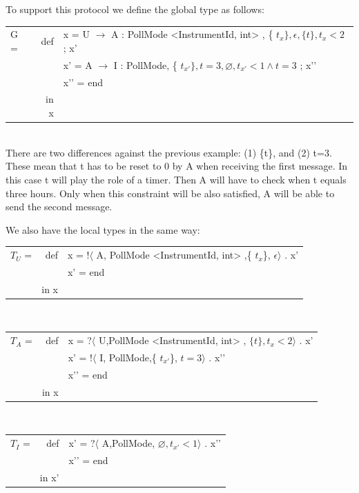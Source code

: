 \documentclass[a4paper,11pt,twoside]{report}
\begin{document}
To support this protocol we define the global type as follows:\\
\begin{tabular}{lrl}
G = & def & x = U $\rightarrow$ A : PollMode <InstrumentId, int> , \{ $t_{x}\}, \epsilon, \{ t \}, t_{x} < 2$  ;  x’\\
&& x' = A $\rightarrow$ I : PollMode, \{ $t_{x'}\}, t=3, \varnothing, t_{x'}<1 \wedge t=3$  ;  x’'\\
&& x’' = end\\
& in x&\\
\end{tabular}\\
There are two differences against the previous example: (1) \{t\}, and (2) t=3. These mean that t has to be reset to 0 by A when receiving the first message. In this case t will play the role of a timer. Then A will have to check when t equals three hours. Only when this constraint will be also satisfied, A will be able to send the second message.

We also have the local types in the same way:\\
\begin{tabular}{lrl}
$T_{U}$ = & def &  x  = !$\langle$ A, PollMode <InstrumentId, int>  ,\{ $t_{x}$\}, $\epsilon \rangle$ . x’\\
&& x’ = end\\
& in x&\\
\end{tabular}\\
\begin{tabular}{lrl}
$T_{A}$ = & def &  x  = ?$\langle$ U,PollMode <InstrumentId, int>  , $\{ t \}, t_{x} < 2 \rangle$ . x’\\
&& x'  = !$\langle$ I, PollMode,\{ $t_{x'}$\}, $t=3 \rangle$ . x’'\\
&& x’' = end\\
& in x&\\
\end{tabular}\\
\begin{tabular}{lrl}
$T_{I}$ = & def &  x'  = ?$\langle$ A,PollMode, $\varnothing, t_{x'} < 1 \rangle$ . x’'\\
&& x’' = end\\
& in x'&\\
\end{tabular}\\
\end{document}
